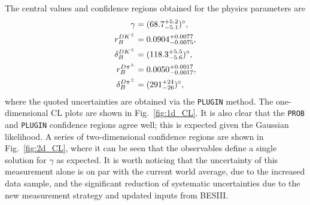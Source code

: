 The central values and confidence regions obtained for the physics parameters are
\begin{align}
\begin{split}\label{eq:phys_results}
    \gamma          &= (68.7^{+5.2}_{-5.1})^\circ, \\
    r_B^{{{D}{{K}^\pm}}}       &= 0.0904^{+0.0077}_{-0.0075}, \\
    \delta_B^{{{D}{{K}^\pm}}}  &= (118.3^{+5.5}_{-5.6})^\circ, \\
    r_B^{D\pi^\pm}      &= 0.0050^{+0.0017}_{-0.0017}, \\
    \delta_B^{D\pi^\pm} &= (291^{+24}_{-26})^\circ,
\end{split}
\end{align}
where the quoted uncertainties are obtained via the \texttt{PLUGIN} method. The one-dimensional CL plots are shown in Fig.~\ref{fig:1d_CL}. It is also clear that the \texttt{PROB} and \texttt{PLUGIN} confidence regions agree well; this is expected given the Gaussian likelihood. A series of two-dimensional confidence regions are shown in Fig.~\ref{fig:2d_CL}, where it can be seen that the observables define a single solution for $\gamma$ as expected. It is worth noticing that the uncertainty of this measurement alone is on par with the current world average, due to the increased data sample, and the significant reduction of systematic uncertainties due to the new measurement strategy and updated inputs from BESIII.

